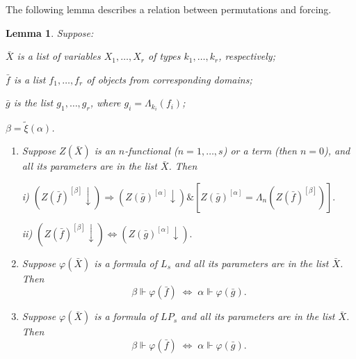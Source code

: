 \documentclass{asl}
\newtheorem{lemma}{Lemma}[section]
\theoremstyle{definition}
\begin{document}
The following lemma describes a relation between permutations and forcing.

\begin{lemma}
Suppose:
\begin{list}{}{}
\item $ \bar{X} $ is a list of variables $ X_1,\ldots,X_r $ of types $ k_1,\ldots,k_r $, respectively;
\item $ \bar{f} $ is a list $ f_1,\ldots,f_r $  of objects from corresponding domains;
\item $ \bar{g} $ is the list $ g_1,\ldots,g_r $, where $ g_i=\Lambda_{k_i}\left( f_i\right)$;
\item $ \beta=\tilde{\xi} (\alpha) $.
\end{list}

\begin{enumerate}
\item Suppose $Z(\bar{X}) $ is an $ n $-functional ($ n=1,\ldots,s $) or a term (then $ n=0 $), and all its parameters are in the list $ \bar{X} $. Then 
\bigskip

i) $ \left(Z(\bar{f})^{[\beta]}\downarrow\right)\Rightarrow \left(Z(\bar{g})^{[\alpha]}\downarrow\right)\&  \left[Z(\bar{g})^{[\alpha]}=\Lambda_n \left( Z(\bar{f})^{[\beta]}\right)\right]. $
\bigskip

ii) $ \left(Z(\bar{f})^{[\beta]}\downarrow\right) \Leftrightarrow \left(Z(\bar{g})^{[\alpha]}\downarrow\right).$
\bigskip

\item Suppose $\varphi(\bar{X}) $ is a formula of $ L_s $ and all its parameters are in the list $ \bar{X} $. Then 
\[  \beta\Vdash \varphi(\bar{f})  \;\Leftrightarrow\;  \alpha\Vdash \varphi(\bar{g})  .\]

\item Suppose $\varphi(\bar{X}) $ is a formula of $ LP_s $ and all its parameters are in the list $ \bar{X} $. Then 
\[  \beta\Vdash \varphi(\bar{f})  \;\Leftrightarrow\;  \alpha\Vdash \varphi(\bar{g})  .\]
\end{enumerate} \label{lemma:equiv_nodes}
\end{lemma} 
\end{document}
